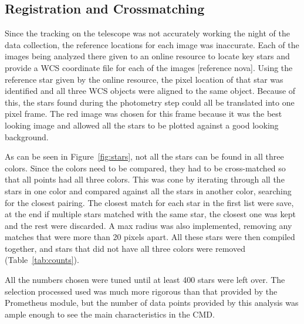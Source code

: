 \documentclass[twoside,11pt]{article}
\begin{document}
\subsection{Registration and Crossmatching}
Since the tracking on the telescope was not accurately working the night of the data collection, the reference locations for each image was inaccurate. Each of the images being analyzed there given to an online resource to locate key stars and provide a WCS coordinate file for each of the images [reference nova]. Using the reference star given by the online resource, the pixel location of that star was identified and all three WCS objects were aligned to the same object. Because of this, the stars found during the photometry step could all be translated into one pixel frame. The red image was chosen for this frame because it was the best looking image and allowed all the stars to be plotted against a good looking background. 

As can be seen in Figure~\ref{fig:stars}, not all the stars can be found in all three colors. Since the colors need to be compared, they had to be cross-matched so that all points had all three colors. This was cone by iterating through all the stars in one color and compared against all the stars in another color, searching for the closest pairing. The closest match for each star in the first list were save, at the end if multiple stars matched with the same star, the closest one was kept and the rest were discarded. A max radius was also implemented, removing any matches that were more than 20 pixels apart. All these stars were then compiled together, and stars that did not have all three colors were removed (Table~\ref{tab:counts}). 

All the numbers chosen were tuned until at least 400 stars were left over. The selection processed used was much more rigorous than that provided by the Prometheus module, but the number of data points provided by this analysis was ample enough to see the main characteristics in the CMD. 
\end{document}
